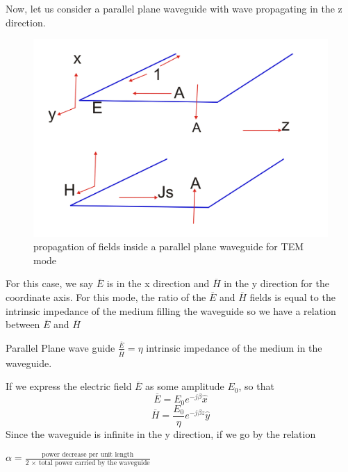 Now, let us consider a parallel plane waveguide with wave propagating in the z direction.
\begin{figure}[h]
\centering
\includegraphics[scale=0.45]{./graphics/lecture2-image-b.png}
\caption{propagation of fields inside a parallel plane waveguide for TEM mode}
\end{figure}
For this case, we say $\overline{E}$ is in the x direction and $\overline{H}$  in the y direction for the coordinate axis. For this mode, the ratio of the $\overline{E}$ and  $\overline{H}$ fields is equal to the intrinsic impedance of the medium filling the waveguide so we have a relation between $\overline{E}$ and  $\overline{H}$

Parallel Plane wave guide $\frac{\overline{E}}{\overline{H}} = \eta $ intrinsic impedance of the medium in the waveguide.

If we express the electric field $\overline{E}$ as some amplitude $E_0$, so that
\begin{equation}
\overline{E} = E_0 e^{-j\beta }\hat{x}
\end{equation}
\begin{equation}
\overline{H} = \frac{E_0}{\eta} e^{-j\beta z}\hat{y}
\end{equation}
Since the waveguide is infinite in the y direction, if we go by the relation
\begin{center}
$\alpha = \frac{\text{power decrease per unit length}}{\text{2 $\times$ total power carried by the waveguide}}$	
\end{center}

